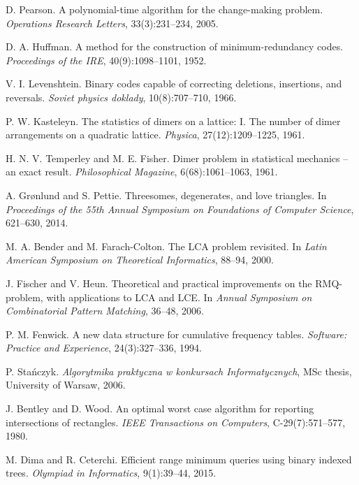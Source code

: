 \begin{thebibliography}{9}
    D. Pearson.
    A polynomial-time algorithm for the change-making problem.
    \emph{Operations Research Letters}, 33(3):231--234, 2005.
  
    D. A. Huffman.
    A method for the construction of minimum-redundancy codes.
    \emph{Proceedings of the IRE}, 40(9):1098--1101, 1952.
  
    V. I. Levenshtein.
    Binary codes capable of correcting deletions, insertions, and reversals.
    \emph{Soviet physics doklady}, 10(8):707--710, 1966.
  
    P. W. Kasteleyn.  
    The statistics of dimers on a lattice: I. The number of dimer arrangements on a quadratic lattice.
    \emph{Physica}, 27(12):1209--1225, 1961.
  
    H. N. V. Temperley and M. E. Fisher.
    Dimer problem in statistical mechanics -- an exact result.
    \emph{Philosophical Magazine}, 6(68):1061--1063, 1961.
  
    A. Grønlund and S. Pettie.
    Threesomes, degenerates, and love triangles.
    In \emph{Proceedings of the 55th Annual Symposium on Foundations of Computer Science},
    621--630, 2014.
  
    M. A. Bender and M. Farach-Colton.
    The LCA problem revisited. In
    \emph{Latin American Symposium on Theoretical Informatics}, 88--94, 2000.
  
    J. Fischer and V. Heun.
    Theoretical and practical improvements on the RMQ-problem, with applications to LCA and LCE.
    In \emph{Annual Symposium on Combinatorial Pattern Matching}, 36--48, 2006.
  
    P. M. Fenwick.
    A new data structure for cumulative frequency tables.
    \emph{Software: Practice and Experience}, 24(3):327--336, 1994.
  
    P. Stańczyk.
    \emph{Algorytmika praktyczna w konkursach Informatycznych},
    MSc thesis, University of Warsaw, 2006.
  
    J. Bentley and D. Wood.
    An optimal worst case algorithm for reporting intersections of rectangles.
    \emph{IEEE Transactions on Computers}, C-29(7):571--577, 1980.
  
    M. Dima and R. Ceterchi.
    Efficient range minimum queries using binary indexed trees.
    \emph{Olympiad in Informatics}, 9(1):39--44, 2015.
  

\end{thebibliography}
